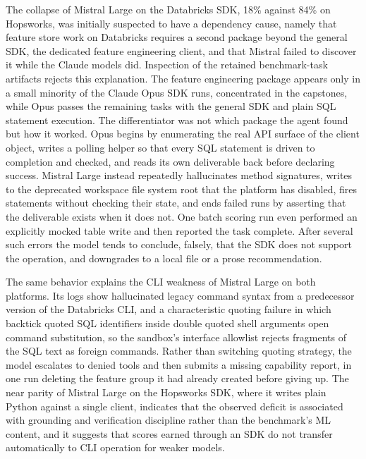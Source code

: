 \documentclass[
english,                 %
bibtex,                  %
]{kththesis}
\numberwithin{listing}{chapter}
\begin{document}
The collapse of Mistral Large on the Databricks \gls{SDK}, 18\% against 84\% on Hopsworks, was initially suspected to have a dependency cause, namely that feature store work on Databricks requires a second package beyond the general \gls{SDK}, the dedicated feature engineering client, and that Mistral failed to discover it while the Claude models did. Inspection of the retained benchmark-task artifacts rejects this explanation. The feature engineering package appears only in a small minority of the Claude Opus \gls{SDK} runs, concentrated in the capstones, while Opus passes the remaining tasks with the general \gls{SDK} and plain \gls{SQL} statement execution. The differentiator was not which package the agent found but how it worked. Opus begins by enumerating the real \gls{API} surface of the client object, writes a polling helper so that every \gls{SQL} statement is driven to completion and checked, and reads its own deliverable back before declaring success. Mistral Large instead repeatedly hallucinates method signatures, writes to the deprecated workspace file system root that the platform has disabled, fires statements without checking their state, and ends failed runs by asserting that the deliverable exists when it does not. One batch scoring run even performed an explicitly mocked table write and then reported the task complete. After several such errors the model tends to conclude, falsely, that the \gls{SDK} does not support the operation, and downgrades to a local file or a prose recommendation.

The same behavior explains the \gls{CLI} weakness of Mistral Large on both platforms. Its logs show hallucinated legacy command syntax from a predecessor version of the Databricks \gls{CLI}, and a characteristic quoting failure in which backtick quoted \gls{SQL} identifiers inside double quoted shell arguments open command substitution, so the sandbox's interface allowlist rejects fragments of the \gls{SQL} text as foreign commands. Rather than switching quoting strategy, the model escalates to denied tools and then submits a missing capability report, in one run deleting the feature group it had already created before giving up. The near parity of Mistral Large on the Hopsworks \gls{SDK}, where it writes plain Python against a single client, indicates that the observed deficit is associated with grounding and verification discipline rather than the benchmark's \gls{ML} content, and it suggests that scores earned through an \gls{SDK} do not transfer automatically to \gls{CLI} operation for weaker models.
\end{document}
